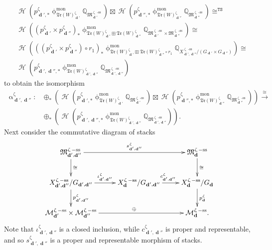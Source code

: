 \documentclass[a4paper,10pt]{amsart}
\renewcommand{\alpha}{\upalpha}
\renewcommand{\zeta}{\upzeta}
\renewcommand{\phi}{\upphi}
\newcommand{\QQ}{\mathbb{Q}}
\newcommand{\TS}{\mathtt{TS}}
\newcommand{\WWW}{\mathfrak{Tr}(W)}
\newcommand{\Mst}{\mathfrak{M}}
\newcommand{\Msp}{\mathcal{M}}
\newcommand{\phim}[1]{\phi^{\mon}_{#1}}
\DeclareMathOperator{\sst}{-ss}
\DeclareMathOperator{\mon}{mon}
\DeclareMathOperator{\dd}{\mathbf{d}}
\DeclareMathOperator{\Ho}{\mathcal{H}}
\begin{document}
\begin{align*}
&\Ho\left(p^{\zeta}_{\dd',*}\phim{\WWW^{\zeta}_{\dd'}}\QQ_{\Mst_{\dd'}^{\zeta\sst}}\right)\boxtimes \Ho\left(p^{\zeta}_{\dd'',*}\phim{\WWW^{\zeta}_{\dd''}}\QQ_{\Mst^{\zeta\sst}_{\dd''}}\right)\cong^{\TS}\\
&\Ho\left((p^{\zeta}_{\dd'}\times p^{\zeta}_{\dd''})_*\phim{\WWW^{\zeta}_{\dd'}\boxplus\WWW^{\zeta}_{\dd''}}\QQ_{\Mst^{\zeta\sst}_{\dd'}\times\Mst^{\zeta\sst}_{\dd''}}\right)\cong\\
& \Ho\left(((p^{\zeta}_{\dd'}\times p^{\zeta}_{\dd''})\circ r_{1})_*\phim{\WWW^{\zeta}_{\dd'}\boxplus\WWW^{\zeta}_{\dd''}\circ r_1}\QQ_{X^{\zeta\sst}_{\dd',\dd''}/\left(G_{\dd'}\times G_{\dd''}\right)}\right)\cong\\
&\Ho\left(p^{\zeta}_{\dd',\dd'',*}\phim{\WWW^{\zeta}_{\dd',\dd''}}\QQ_{\Mst_{\dd',\dd''}^{\zeta\sst}}\right)
\end{align*}
to obtain the isomorphism
\begin{align*}
\alpha^{\zeta}_{\dd',\dd''}\colon&\oplus_*\left(\Ho\left(p^{\zeta}_{\dd',*}\phim{\WWW^{\zeta}_{\dd'}}\QQ_{\Mst_{\dd'}^{\zeta\sst}}\right)\boxtimes \Ho\left(p^{\zeta}_{\dd'',*}\phim{\WWW^{\zeta}_{\dd''}}\QQ_{\Mst^{\zeta\sst}_{\dd''}}\right)\right)\xrightarrow{\cong}\\& \oplus_*\left(\Ho\left(p^{\zeta}_{\dd',\dd'',*}\phim{\WWW^{\zeta}_{\dd',\dd''}}\QQ_{\Mst_{\dd',\dd''}^{\zeta\sst}}\right)\right).
\end{align*}
Next consider the commutative diagram of stacks
\begin{equation}
\label{smap}
\xymatrix{
\Mst^{\zeta\sst}_{\dd',\dd''}\ar[d]^{\cong}\ar[rr]^-{s^{\zeta}_{\dd',\dd''}}&&\Mst_{\dd}^{\zeta\sst}\ar[d]^{\cong}\\
X^{\zeta\sst}_{\dd',\dd''}/G_{\dd',\dd''}\ar[d]^{p^{\zeta}_{\dd',\dd''}}\ar[r]^{\iota^{\zeta}_{\dd',\dd''}}&X^{\zeta\sst}_{\dd}/G_{\dd',\dd''}\ar[r]^{c^{\zeta}_{\dd',\dd''}}&X^{\zeta\sst}_{\dd}/G_{\dd}\ar[d]^{p^{\zeta}_{\dd}}\\
\Msp^{\zeta\sst}_{\dd'}\times\Msp^{\zeta\sst}_{\dd''}\ar[rr]^{\oplus}&&\Msp^{\zeta\sst}_{\dd}.
}
\end{equation}
Note that $\iota_{\dd',\dd''}^\zeta$ is a closed inclusion, while $c_{\dd',\dd''}^\zeta$ is proper and representable, and so $s_{\dd',\dd''}^\zeta$ is a proper and representable morphism of stacks.
\end{document}

